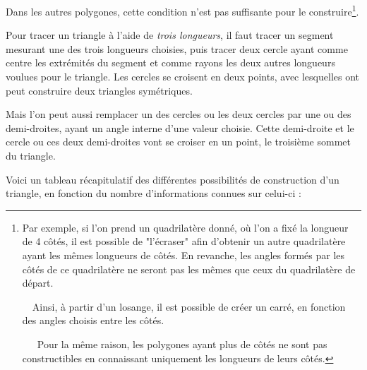 \documentclass[a4paper]{article}
\begin{document}
			Dans les autres polygones, cette condition n'est pas suffisante pour le construire\footnote{
				Par exemple, si l'on prend un quadrilatère donné, 
				où l'on a fixé la longueur de 4 côtés,
				il est possible de "l'écraser" afin d'obtenir un autre
				quadrilatère ayant les mêmes longueurs de côtés.
				En revanche, les angles formés par les côtés de ce quadrilatère 
				ne seront pas les mêmes que ceux du quadrilatère de départ.
				
				~~Ainsi, à partir d'un losange, il est possible de créer un carré, 
				en fonction des angles choisis entre les côtés.

				~~~Pour la même raison, 
				les polygones ayant plus de côtés ne sont pas constructibles
				en connaissant uniquement les longueurs de leurs côtés.
			}.

			\medbreak

			Pour tracer un triangle à l'aide de \textit{trois longueurs}, 
			il faut tracer un segment mesurant une des trois longueurs choisies, 
			puis tracer deux cercle ayant comme centre les extrémités du segment 
			et comme rayons les deux autres longueurs voulues pour le triangle. 
			Les cercles se croisent en deux points, 
			avec lesquelles ont peut construire deux triangles symétriques.

			\medbreak

			Mais l'on peut aussi remplacer un des cercles ou les deux 
			cercles par une ou des demi-droites, 
			ayant un angle interne d'une valeur choisie. 
			Cette demi-droite et le cercle ou ces deux demi-droites 
			vont se croiser en un point, le troisième sommet du triangle.

			Voici un tableau récapitulatif des différentes possibilités de construction d'un triangle, 
			en fonction du nombre d'informations connues sur celui-ci :
\end{document}
